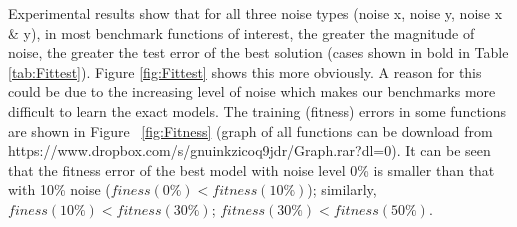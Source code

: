 Experimental results show that for all three noise types (noise x, noise y, noise x \& y), in most benchmark functions of interest, the greater the magnitude of noise, the greater the test error of the best solution (cases shown in bold in Table \ref{tab:Fittest}). Figure \ref{fig:Fittest} shows this more obviously. A reason for this could be due to the increasing level of noise which makes our benchmarks more difficult to learn the exact models. The training (fitness) errors in some functions are shown in Figure ~\ref{fig:Fitness} (graph of all functions can be download from https://www.dropbox.com/s/gnuinkzicoq9jdr/Graph.rar?dl=0). 
It can be seen that the fitness error of the best model with noise level 0\% is smaller than that with 10\% noise ($finess(0 \%) < fitness(10\%)$); similarly, $finess(10\%) < fitness(30\%)$; $fitness(30\%) < fitness(50\%)$. \par

